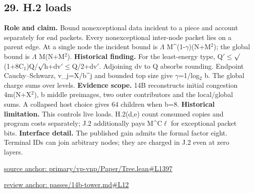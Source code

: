 \documentclass[11pt,letterpaper]{article}
\theoremstyle{definition}\newtheorem{definition}[theorem]{Definition}\newtheorem{example}[theorem]{Example}
\theoremstyle{remark}\newtheorem{remark}[theorem]{Remark}
\begin{document}
\subsection*{29. H.2 loads}
\textbf{Role and claim.} Bound nonexceptional data incident to a piece and account separately for end packets. Every nonexceptional inter-node packet lies on a parent edge. At a single node the incident bound is \ensuremath{\Lambda} M\textasciicircum{}(1-\ensuremath{\gamma})(N+M\ensuremath{{}^2}); the global bound is \ensuremath{\Lambda} M(N+M\ensuremath{{}^2}).
\textbf{Historical finding.} For the least-energy type, Q\ensuremath{\prime}\ensuremath{\le}\ensuremath{\sqrt{\vphantom{x}}}(1+8C\ensuremath{{}_1})Q/\ensuremath{\sqrt{\vphantom{x}}}h+dv\ensuremath{\prime}\ensuremath{\le}Q/2+dv\ensuremath{\prime}. Adjoining dv to Q absorbs rounding. Endpoint Cauchy–Schwarz, v\_j=X/b\textasciicircum{}j and bounded top size give \ensuremath{\gamma}=1/log\ensuremath{{}_2} b. The global charge sums over levels.
\textbf{Evidence scope.} 14B reconstructs initial congestion 4m(N+X\ensuremath{{}^2}), b middle preimages, two outer contributors and the local/global sums. A collapsed host choice gives 64 children when b=8.
\textbf{Historical limitation.} This controls live loads. H.2(d,e) count consumed copies and program costs separately; J.2 additionally pays M\textasciicircum{}C\ensuremath{\ell} for exceptional packet bits.
\textbf{Interface detail.} The published gain admits the formal factor eight. Terminal IDs can join arbitrary nodes; they are charged in J.2 even at zero layers.
\par\href{https://github.com/nousentllc/VP-VNP-Review/blob/8a7976933b6b2b4ffda1ad3a0dfb5fc6b6f023e8/primary/vp-vnp/Paper/Tree.lean\#L1397}{source anchor: primary/vp-vnp/Paper/Tree.lean\#L1397}
\par\href{https://github.com/nousentllc/VP-VNP-Review/blob/8a7976933b6b2b4ffda1ad3a0dfb5fc6b6f023e8/passes/14b-tower.md\#L12}{review anchor: passes/14b-tower.md\#L12}
\goodbreak
{}
\hypertarget{claim.30}{}
\end{document}
